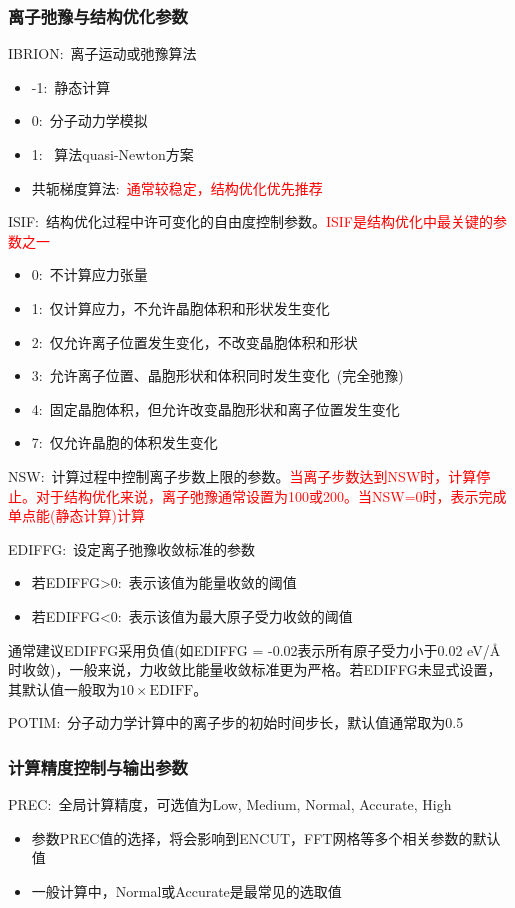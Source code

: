 \subsubsection{离子弛豫与结构优化参数}
\textrm{IBRION}:~离子运动或弛豫算法
\begin{itemize}
	\item \textrm{-1}:~静态计算
	\item \textrm{0}:~分子动力学模拟
	\item \textrm{1}:~%
		算法\textrm{quasi-Newton}方案
	\item 共轭梯度算法:~\textcolor{red}{通常较稳定，结构优化优先推荐}
\end{itemize}

\textrm{ISIF}:~结构优化过程中许可变化的自由度控制参数。\textcolor{red}{\textrm{ISIF}是结构优化中最关键的参数之一}
\begin{itemize}
	\item 0:~不计算应力张量
	\item 1:~仅计算应力，不允许晶胞体积和形状发生变化
	\item 2:~仅允许离子位置发生变化，不改变晶胞体积和形状
	\item 3:~允许离子位置、晶胞形状和体积同时发生变化~(完全弛豫)
	\item 4:~固定晶胞体积，但允许改变晶胞形状和离子位置发生变化
	\item 7:~仅允许晶胞的体积发生变化
\end{itemize}

\textrm{NSW}:~计算过程中控制离子步数上限的参数。\textcolor{red}{当离子步数达到\textrm{NSW}时，计算停止。对于结构优化来说，离子弛豫通常设置为100或200。当NSW=0时，表示完成单点能(静态计算)计算}

\textrm{EDIFFG}:~设定离子弛豫收敛标准的参数
\begin{itemize}
	\item 若\textrm{EDIFFG>0}:~表示该值为能量收敛的阈值
	\item 若\textrm{EDIFFG<0}:~表示该值为最大原子受力收敛的阈值
\end{itemize}
通常建议\textrm{EDIFFG}采用负值(如\textrm{EDIFFG = -0.02}表示所有原子受力小于\textrm{0.02 eV/\AA}时收敛)，一般来说，力收敛比能量收敛标准更为严格。若\textrm{EDIFFG}未显式设置，其默认值一般取为$10\times\mathrm{EDIFF}$。

\textrm{POTIM}:~分子动力学计算中的离子步的初始时间步长，默认值通常取为0.5

\subsubsection{计算精度控制与输出参数}
\textrm{PREC}:~全局计算精度，可选值为\textrm{Low, Medium, Normal, Accurate, High}
\begin{itemize}
	\item 参数\textrm{PREC}值的选择，将会影响到\textrm{ENCUT}，\textrm{FFT}网格等多个相关参数的默认值
	\item 一般计算中，\textrm{Normal}或\textrm{Accurate}是最常见的选取值
\end{itemize}

